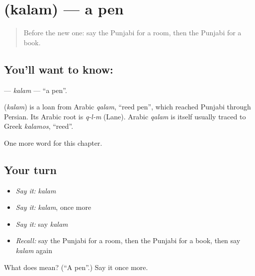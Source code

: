 \section[\texorpdfstring{\pa{ਕਲਮ} (kalam)}{ਕਲਮ (kalam)}]{ (kalam) — a pen}

\label{lesson:PA-C71-kalam}



\begin{quote}
Before the new one: say the Punjabi for a room, then the Punjabi for a book.
\end{quote}

\subsection*{You'll want to know: }
\textbf{} — \emph{kalam} — \textquotedblleft{}a pen\textquotedblright{}.

\begin{cousinweb}
\textbf{} (\emph{kalam}) is a loan from Arabic \emph{qalam}, \textquotedblleft{}reed pen\textquotedblright{}, which reached Punjabi through Persian. Its Arabic root is \emph{q-l-m} (Lane). Arabic \emph{qalam} is itself usually traced to Greek \emph{kalamos}, \textquotedblleft{}reed\textquotedblright{}.
\end{cousinweb}

\begin{grammarlens}[title={What you've built}]
One more word for this chapter.
\end{grammarlens}

\subsection*{Your turn}
\begin{itemize}
\raggedright
  \item \emph{Say it:} \emph{kalam}
  \item \emph{Say it:} \emph{kalam}, once more
  \item \emph{Say it:} say \emph{kalam}
  \item \emph{Recall:} say the Punjabi for a room, then the Punjabi for a book, then say \emph{kalam} again
\end{itemize}

\begin{tcolorbox}[breakable,colback=teal!4,colframe=teal!35!black,title={Before you move on}]
What does  mean? (\textquotedblleft{}A pen\textquotedblright{}.) Say it once more.
\end{tcolorbox}
